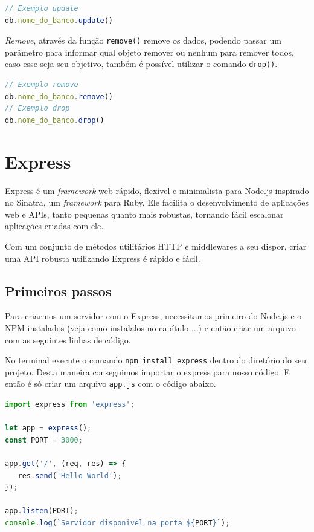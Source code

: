 \documentclass[
	12pt,				%
	openright,			%
	twoside,			%
	a4paper,			%
	english,			%
	brazil				%
	]{abntex2}
\begin{document}
\begin{lstlisting}[language=javascript]
// Exemplo update
db.nome_do_banco.update()
\end{lstlisting}

\textit{Remove}, através da função \verb|remove()| remove os dados, podendo passar um parâmetro para informar qual objeto remover ou nenhum para remover todos, caso esse seja seu objetivo, também é possível utilizar o comando \verb|drop()|.

\begin{lstlisting}[language=javascript]
// Exemplo remove
db.nome_do_banco.remove()
// Exemplo drop
db.nome_do_banco.drop()
\end{lstlisting}


\section{Express}

Express é um \textit{framework} web rápido, flexível e minimalista para Node.js inspirado no Sinatra, um \textit{framework} para Ruby. Ele facilita o desenvolvimento de aplicações web e APIs, tanto pequenas quanto mais robustas, tornando fácil escalonar aplicações criadas com ele.

Com um conjunto de métodos utilitários HTTP e middlewares a seu dispor, criar uma API robusta utilizando Express é rápido e fácil.

\subsection {Primeiros passos}

Para criarmos um servidor com o Express, necessitamos primeiro do Node.js e o NPM instalados (veja como instalalos no capítulo ...) e então criar um arquivo com as seguintes linhas de código.

No terminal execute o comando \verb|npm install express| dentro do diretório do seu projeto. Desta maneira conseguimos importar o express para nosso código. E então é só criar um arquivo \verb|app.js| com o código abaixo.

\begin{lstlisting}[language=javascript]
import express from 'express';

let app = express();
const PORT = 3000;

app.get('/', (req, res) => {
   res.send('Hello World');
});

app.listen(PORT);
console.log(`Servidor disponivel na porta ${PORT}`);
\end{lstlisting}
\end{document}
